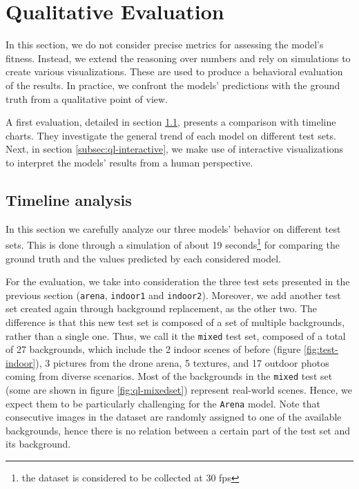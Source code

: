 



\section{Qualitative Evaluation}
\label{sec:evaluation-qualitative}

In this section, we do not consider precise metrics for assessing the model's fitness. Instead, we extend the reasoning over numbers and rely on simulations to create various visualizations. These are used to produce a behavioral evaluation of the results. In practice, we confront the models' predictions with the ground truth from a qualitative point of view.

A first evaluation, detailed in section \ref{subsec:ql-timeline}, presents a comparison with timeline charts. They investigate the general trend of each model on different test sets. Next, in section \ref{subsec:ql-interactive}, we make use of interactive visualizations to interpret the models' results from a human perspective.



\subsection{Timeline analysis}
\label{subsec:ql-timeline}

In this section we carefully analyze our three models' behavior on different test sets. This is done through a simulation of about 19 seconds\footnote{the dataset is considered to be collected at 30 \gls{fps}} for comparing the ground truth and the values predicted by each considered model.

For the evaluation, we take into consideration the three test sets presented in the previous section (\texttt{arena}, \texttt{indoor1} and \texttt{indoor2}). Moreover, we add another test set created again through background replacement, as the other two. The difference is that this new test set is composed of a set of multiple backgrounds, rather than a single one. Thus, we call it the \texttt{mixed} test set, composed of a total of 27 backgrounds, which include the 2 indoor scenes of before (figure \ref{fig:test-indoor}), 3 pictures from the drone arena, 5 textures, and 17 outdoor photos coming from diverse scenarios. Most of the backgrounds in the \texttt{mixed} test set (some are shown in figure \ref{fig:ql-mixedset}) represent real-world scenes. Hence, we expect them to be particularly challenging for the \texttt{Arena} model. Note that consecutive images in the dataset are randomly assigned to one of the available backgrounds, hence there is no relation between a certain part of the test set and its background.

